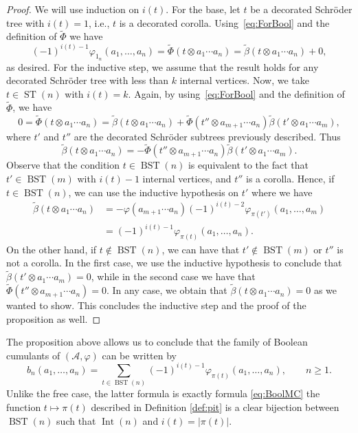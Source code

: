 \documentclass[pdftex]{sigma}%
\numberwithin{equation}{section}
\newcommand{\A}{\mathcal{A}}
\newcommand{\Int}{\operatorname{Int}}
\newcommand{\ST}{\operatorname{ST}}
\begin{document}
\begin{proof}We will use induction on $i(t)$. For the base, let $t$ be a decorated Schr\"oder tree with $i(t)=1$, i.e., $t$ is a decorated corolla. Using~\eqref{eq:ForBool} and the definition of $\tilde\Phi$ we have
\[
(-1)^{i(t)-1}\varphi_{1_n}(a_1,\dots, a_n) = \tilde\Phi(t\otimes a_1\cdots a_n)
=\tilde\beta(t\otimes a_1\cdots a_n) + 0,
\]
as desired. For the inductive step, we assume that the result holds for any decorated Schr\"oder tree with less than $k$ internal vertices. Now, we take $t\in \ST(n)$ with $i(t) =k$. Again, by using~\eqref{eq:ForBool} and the definition of $\tilde\Phi$, we have
\[
0= \tilde\Phi(t\otimes a_1\cdots a_n) = \tilde\beta(t\otimes a_1\cdots a_n) + \tilde\Phi(t'' \otimes a_{m+1}\cdots a_n) \tilde{\beta}(t'\otimes a_{1}\cdots a_m),
\]
where $t'$ and $t''$ are the decorated Schr\"oder subtrees previously described. Thus
\[ \tilde\beta(t\otimes a_1\cdots a_n) = -\tilde\Phi(t'' \otimes a_{m+1}\cdots a_n) \tilde{\beta}(t'\otimes a_{1}\cdots a_m).\]
Observe that the condition $t\in \operatorname{BST}(n)$ is equivalent to the fact that $t'\in \operatorname{BST}(m)$ with $i(t)-1$ internal vertices, and $t''$ is a corolla. Hence, if $t\in \operatorname{BST}(n)$, we can use the inductive hypothesis on $t'$ where we have
\begin{align*}
 \tilde\beta(t\otimes a_1\cdots a_n) &= -\varphi(a_{m+1}\cdots a_n) (-1)^{i(t)-2}\varphi_{\pi(t')}(a_1,\dots,a_m)
 \\ &= (-1)^{i(t)-1}\varphi_{\pi(t)}(a_1,\dots,a_n).
\end{align*}
On the other hand, if $t\not\in \operatorname{BST}(n)$, we can have that $t'\not\in \operatorname{BST}(m)$ or $t''$ is not a corolla. In the first case, we use the inductive hypothesis to conclude that $\tilde\beta(t'\otimes a_1\cdots a_m) = 0$, while in the second case we have that $\tilde\Phi(t''\otimes a_{m+1}\cdots a_n)=0$. In any case, we obtain that $\tilde\beta(t\otimes a_1\cdots a_n)=0$ as we wanted to show. This concludes the inductive step and the proof of the proposition as well.
\end{proof}

The proposition above allows us to conclude that the family of Boolean cumulants of $(\A,\varphi)$ can be written by
\begin{equation}
\label{eq:BoolST}
b_n(a_1,\dots,a_n) = \sum_{t\in \operatorname{BST}(n)} (-1)^{i(t)-1} \varphi_{\pi(t)}(a_1,\dots,a_n), \qquad n\geq1.
\end{equation} Unlike the free case, the latter formula is exactly formula \eqref{eq:BoolMC} the function $t\mapsto\pi(t)$ described in Definition \ref{def:pit} is a clear bijection between $\operatorname{BST}(n)$ such that $\Int(n)$ and $i(t) = |\pi(t)|$.
\end{document}
